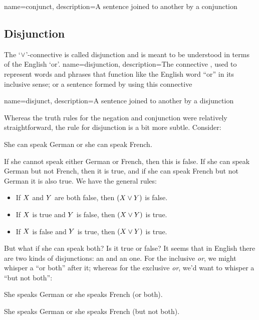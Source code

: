 {
name=conjunct,
description={A sentence joined to another by a \gls{conjunction}}
}


\subsection{Disjunction}
The `$\vee$'-connective is called disjunction and is meant to be understood in terms of the English `or'.
{
name=disjunction,
description={The connective \eor, used to represent words and phrases that function like the English word ``or'' in its inclusive sense; or a sentence formed by using this connective}
}

{
name=disjunct,
description={A sentence joined to another by a \gls{disjunction}}
}

Whereas the truth rules for the negation and conjunction were relatively straightforward, the rule for disjunction is a bit more subtle.
Consider:
\begin{earg}
\item[\ex{conj}] She can speak German or she can speak French.
\end{earg}
If she cannot speak either German or French, then this is false. If she can speak German but not French, then it is true, and if she can speak French but not German it is also true.
We have the general rules:
\begin{itemize}
\item If $X$ and $Y$ are both false, then $(X\vee Y)$ is false.
\item  If $X$ is true and $Y$ is false, then $(X\vee Y)$ is true.
\item  If $X$ is false and $Y$ is true, then $(X\vee Y)$ is true.
\end{itemize}

But what if she can speak both? Is it true or false?
It seems that in English there are two kinds of disjunctions: an  and an  one. For the inclusive \emph{or}, we might whisper a ``or both'' after it; whereas for the exclusive \emph{or}, we'd want to whisper a ``but not both'':
\begin{earg}
\item [\ex{inclor}] She speaks German or
she speaks French (or both).
\item [\ex{exclor}] She speaks German or
she speaks French (but not both).
\end{earg}

